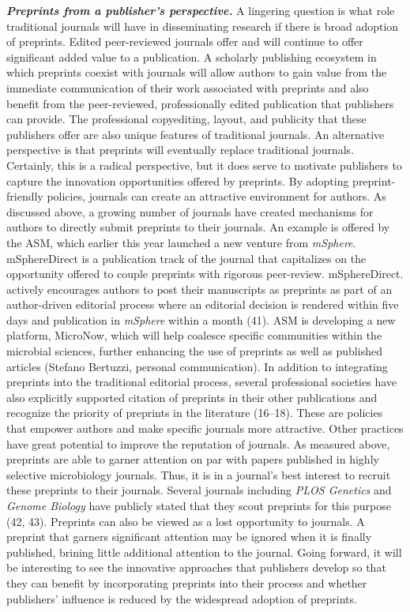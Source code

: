 \documentclass[11pt,]{article}
\begin{document}
\textbf{\emph{Preprints from a publisher's perspective.}} A lingering
question is what role traditional journals will have in disseminating
research if there is broad adoption of preprints. Edited peer-reviewed
journals offer and will continue to offer significant added value to a
publication. A scholarly publishing ecosystem in which preprints coexist
with journals will allow authors to gain value from the immediate
communication of their work associated with preprints and also benefit
from the peer-reviewed, professionally edited publication that
publishers can provide. The professional copyediting, layout, and
publicity that these publishers offer are also unique features of
traditional journals. An alternative perspective is that preprints will
eventually replace traditional journals. Certainly, this is a radical
perspective, but it does serve to motivate publishers to capture the
innovation opportunities offered by preprints. By adopting
preprint-friendly policies, journals can create an attractive
environment for authors. As discussed above, a growing number of
journals have created mechanisms for authors to directly submit
preprints to their journals. An example is offered by the ASM, which
earlier this year launched a new venture from \emph{mSphere}.
mSphereDirect is a publication track of the journal that capitalizes on
the opportunity offered to couple preprints with rigorous peer-review.
mSphereDirect. actively encourages authors to post their manuscripts as
preprints as part of an author-driven editorial process where an
editorial decision is rendered within five days and publication in
\emph{mSphere} within a month (41). ASM is developing a new platform,
MicroNow, which will help coalesce specific communities within the
microbial sciences, further enhancing the use of preprints as well as
published articles (Stefano Bertuzzi, personal communication). In
addition to integrating preprints into the traditional editorial
process, several professional societies have also explicitly supported
citation of preprints in their other publications and recognize the
priority of preprints in the literature (16--18). These are policies
that empower authors and make specific journals more attractive. Other
practices have great potential to improve the reputation of journals. As
measured above, preprints are able to garner attention on par with
papers published in highly selective microbiology journals. Thus, it is
in a journal's best interest to recruit these preprints to their
journals. Several journals including \emph{PLOS Genetics} and
\emph{Genome Biology} have publicly stated that they scout preprints for
this purpose (42, 43). Preprints can also be viewed as a lost
opportunity to journals. A preprint that garners significant attention
may be ignored when it is finally published, brining little additional
attention to the journal. Going forward, it will be interesting to see
the innovative approaches that publishers develop so that they can
benefit by incorporating preprints into their process and whether
publishers' influence is reduced by the widespread adoption of
preprints.
\end{document}
